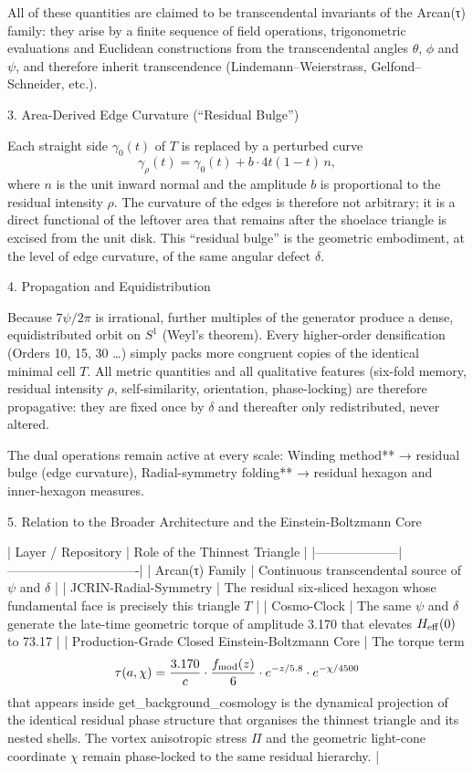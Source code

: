 All of these quantities are claimed to be transcendental invariants of the Arcan(τ) family: they arise by a finite sequence of field operations, trigonometric evaluations and Euclidean constructions from the transcendental angles \(\theta\), \(\phi\) and \(\psi\), and therefore inherit transcendence (Lindemann–Weierstrass, Gelfond–Schneider, etc.).

3. Area-Derived Edge Curvature (“Residual Bulge”)

Each straight side \(\gamma_0(t)\) of \(T\) is replaced by a perturbed curve
\[
\gamma_\rho(t) = \gamma_0(t) + b\cdot 4t(1-t)\,n,
\]
where \(n\) is the unit inward normal and the amplitude \(b\) is proportional to the residual intensity \(\rho\). The curvature of the edges is therefore not arbitrary; it is a direct functional of the leftover area that remains after the shoelace triangle is excised from the unit disk. This “residual bulge” is the geometric embodiment, at the level of edge curvature, of the same angular defect \(\delta\).

4. Propagation and Equidistribution

Because \(7\psi/2\pi\) is irrational, further multiples of the generator produce a dense, equidistributed orbit on \(S^1\) (Weyl’s theorem). Every higher-order densification (Orders 10, 15, 30 …) simply packs more congruent copies of the identical minimal cell \(T\). All metric quantities and all qualitative features (six-fold memory, residual intensity \(\rho\), self-similarity, orientation, phase-locking) are therefore propagative: they are fixed once by \(\delta\) and thereafter only redistributed, never altered.

The dual operations remain active at every scale:
Winding method** → residual bulge (edge curvature),
Radial-symmetry folding** → residual hexagon and inner-hexagon measures.

5. Relation to the Broader Architecture and the Einstein-Boltzmann Core

| Layer / Repository | Role of the Thinnest Triangle |
|--------------------|-------------------------------|
| Arcan(τ) Family | Continuous transcendental source of \(\psi\) and \(\delta\) |
| JCRIN-Radial-Symmetry | The residual six-sliced hexagon whose fundamental face is precisely this triangle \(T\) |
| Cosmo-Clock | The same \(\psi\) and \(\delta\) generate the late-time geometric torque of amplitude 3.170 that elevates \(H_{\rm eff}(0)\) to 73.17 |
| Production-Grade Closed Einstein-Boltzmann Core | The torque term  
\[
\tau(a,\chi)=\frac{3.170}{c}\cdot\frac{f_{\rm mod}(z)}{6}\cdot e^{-z/5.8}\cdot e^{-\chi/4500}
\]  
that appears inside get_background_cosmology is the dynamical projection of the identical residual phase structure that organises the thinnest triangle and its nested shells. The vortex anisotropic stress \(\Pi\) and the geometric light-cone coordinate \(\chi\) remain phase-locked to the same residual hierarchy. |

